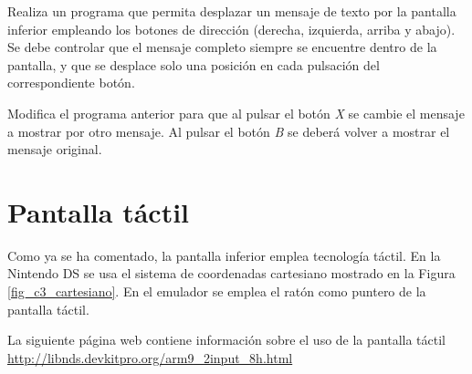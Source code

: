 \begin{exercise}
Realiza un programa que permita desplazar un mensaje de texto por la pantalla inferior empleando los botones de dirección (derecha, izquierda, arriba y abajo). Se debe controlar que el mensaje completo siempre se encuentre dentro de la pantalla, y que se desplace solo una posición en cada pulsación del correspondiente botón.
\end{exercise}

\begin{exercise}
Modifica el programa anterior para que al pulsar el botón \textit{X} se cambie el mensaje a mostrar por otro mensaje. Al pulsar el botón \textit{B} se deberá volver a mostrar el mensaje original.
\end{exercise}

\section{Pantalla táctil}
\label{sec_pantalla_tactil}
Como ya se ha comentado, la pantalla inferior emplea tecnología táctil. En la Nintendo DS se usa el  sistema de coordenadas cartesiano mostrado en la Figura \ref{fig_c3_cartesiano}. En el emulador se emplea el ratón como puntero de la pantalla táctil.

La siguiente página web contiene información sobre el uso de la pantalla táctil  \url{http://libnds.devkitpro.org/arm9_2input_8h.html}

